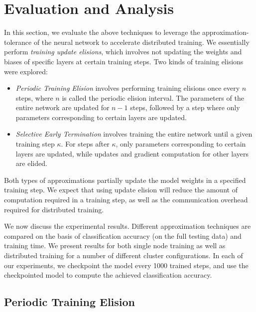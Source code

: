\section{Evaluation and Analysis}
In this section, we evaluate the above techniques to leverage the approximation-tolerance of the neural network to accelerate distributed training. We essentially perform \textit{training update elisions}, which involves not updating the weights and biases of specific layers at certain training steps. Two kinds of training elisions were explored:
\begin{itemize}
	\item \textit{Periodic Training Elision} involves performing training elisions once every $n$ steps, where $n$ is called the periodic elision interval. The parameters of the entire network are updated for $n-1$ steps, followed by a step where only parameters corresponding to certain layers are updated.
	\item \textit{Selective Early Termination} involves training the entire network until a given training step $\kappa$. For steps after $\kappa$, only parameters corresponding to certain layers are updated, while updates and gradient computation for other layers are elided.

\end{itemize}

Both types of approximations partially update the model weights in a specified training step. We expect that using update elision will reduce the amount of computation required in a training step, as well as the communication overhead required for distributed training. 

We now discuss the experimental results. Different approximation techniques are compared on the basis of classification accuracy (on the full testing data) and training time. We present results for both single node training as well as distributed training for a number of different cluster configurations. In each of our experiments, we checkpoint the model every 1000 trained steps, and use the checkpointed model to compute the achieved classification accuracy.

\subsection{Periodic Training Elision}
